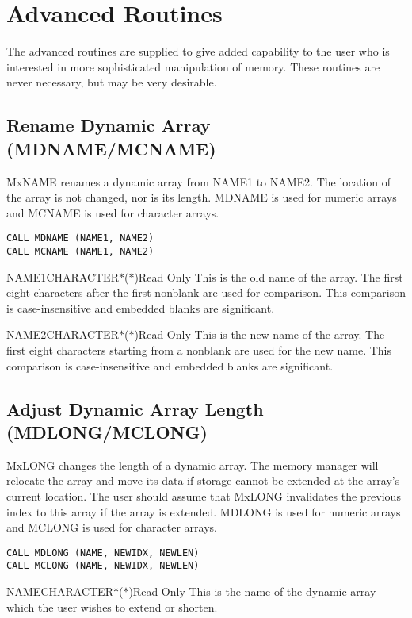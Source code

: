 \section{Advanced Routines}
The advanced routines are supplied to give added capability to the user who
is interested in more sophisticated manipulation of memory.  These routines
are never necessary, but may be very desirable.

\subsection{Rename Dynamic Array (MDNAME/MCNAME)}
MxNAME renames a dynamic array from NAME1 to NAME2.  The location
of the array is not changed, nor is its length. MDNAME is used for numeric
arrays and MCNAME is used for character arrays.
\begin{verbatim}
CALL MDNAME (NAME1, NAME2)
CALL MCNAME (NAME1, NAME2)
\end{verbatim}

\begin{argy}{NAME1}{CHARACTER$*$($*$)}{Read Only}
This is the old name of the array.  The first eight characters after the
first nonblank are
used for comparison.
This comparison is case-insensitive and embedded blanks are
significant.
\end{argy}

\begin{argy}{NAME2}{CHARACTER$*$($*$)}{Read Only}
This is the new name of the array.  The first eight characters starting
from a nonblank are
used for the new name.
This comparison is case-insensitive and embedded blanks are
significant.
\end{argy}

\subsection{Adjust Dynamic Array Length (MDLONG/MCLONG)}
MxLONG changes the length of a dynamic array.  The memory manager
will relocate the array and move its data if storage cannot be extended at
the array's current location.  The user should assume that MxLONG
invalidates the previous index to this array if the array is extended.
MDLONG is used for numeric arrays and MCLONG is used for character arrays.
\begin{verbatim}
CALL MDLONG (NAME, NEWIDX, NEWLEN)
CALL MCLONG (NAME, NEWIDX, NEWLEN)
\end{verbatim}

\begin{argy}{NAME}{CHARACTER$*$($*$)}{Read Only}
This is the name of the dynamic array which the user wishes to extend or
shorten.
\end{argy}

